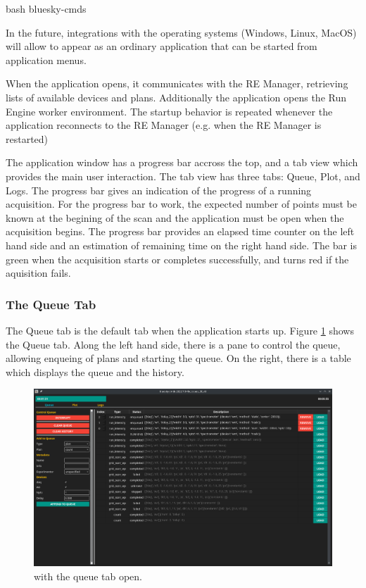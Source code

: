 \begin{codefragment}{bash}
bluesky-cmds
\end{codefragment}

In the future, integrations with the operating systems (Windows, Linux, MacOS) will allow \blueskycmds to appear as an ordinary application that can be started from application menus.

When the application opens, it communicates with the RE Manager, retrieving lists of available devices and plans.
Additionally the application opens the Run Engine worker environment.
The startup behavior is repeated whenever the application reconnects to the RE Manager (e.g. when the RE Manager is restarted)

The application window has a progress bar accross the top, and a tab view which provides the main user interaction.
The tab view has three tabs: Queue, Plot, and Logs.
The progress bar gives an indication of the progress of a running acquisition.
For the progress bar to work, the expected number of points must be known at the begining of the scan and the application must be open when the acquisition begins.
The progress bar provides an elapsed time counter on the left hand side and an estimation of remaining time on the right hand side.
The bar is green when the acquisition starts or completes successfully, and turns red if the aquisition fails.

\subsubsection{The Queue Tab}

The Queue tab is the default tab when the application starts up.
Figure \ref{acq:fig:queue_tab} shows the Queue tab.
Along the left hand side, there is a pane to control the queue, allowing enqueing of plans and starting the queue.
On the right, there is a table which displays the queue and the history.

\begin{landscape}
\begin{figure}
\includegraphics[width=9in]{"acquisition/images/queue_tab"}
\caption[The Queue Tab]{
	\blueskycmds with the queue tab open.
}
\label{acq:fig:queue_tab}
\end{figure}
\end{landscape}

